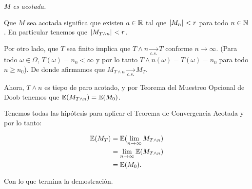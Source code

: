\emph{
    $M$ es acotada.
}

\afterstatement\pn

Que $M$ sea acotada significa que existen $a \in  \mathbb{R}$ tal que $\hspace{.25mm}\left|M_n\right|\hspace{.25mm} < r$ para todo $n \in \mathbb{N}$. En particular 
tenemos que $\hspace{.25mm}\left|M_{T \wedge n}\right|\hspace{.25mm} < r$.\pn

Por otro lado, que $T$ sea finito implica que $T \wedge n  \underset{c.s.}\longrightarrow T$ conforme $n \rightarrow \infty$.
(Para todo $\omega \in \Omega$, $T(\omega) = n_0 < \infty$ y por lo tanto $T \wedge n (\omega) = T(\omega) = n_0$ para todo
$n \geq n_0$). De donde afirmamos que $M_{T \wedge n} \underset{c.s.}\longrightarrow M_T$. \pn

Ahora, $T \wedge n$ es tiepo de paro acotado, y por Teorema del Muestreo Opcional de Doob tenemos que 
$\mathbb{E}(M_{T \wedge n}) = \mathbb{E}(M_0)$.\pn

Tenemos todas las hipótesis para aplicar el Teorema de Convergencia Acotada y por lo tanto:

\begin{align}
    \mathbb{E}(M_T)     &=  \mathbb{E}(\lim_{n \rightarrow \infty} M_{T \wedge n})     \\
                &=  \lim_{n \rightarrow \infty} \mathbb{E}(M_{T \wedge n})     \\
                &=  \mathbb{E}(M_0).
\end{align}\pn

Con lo que termina la demostración.
 